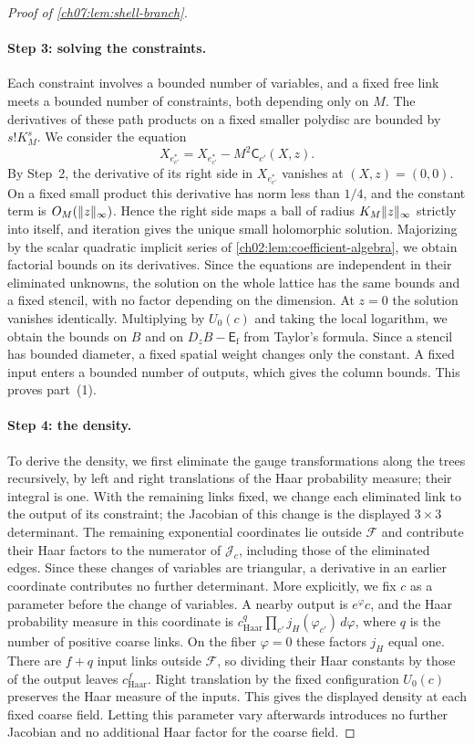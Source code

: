 \begin{proof}[Proof of \cref{ch07:lem:shell-branch}]
\paragraph{Step 3: solving the constraints.}
Each constraint involves a bounded number of variables, and a fixed free link meets a bounded number of constraints, both depending only on $M$. The derivatives of these path products on a fixed smaller polydisc are bounded by $s!K_M^s$. We consider the equation
\[
 X_{e^*_{c'}}=X_{e^*_{c'}}-M^2\mathsf C_{c'}(X,z).
\]
By Step~2, the derivative of its right side in $X_{e^*_{c'}}$ vanishes at $(X,z)=(0,0)$. On a fixed small product this derivative has norm less than $1/4$, and the constant term is $O_M(\lVert z\rVert_\infty)$. Hence the right side maps a ball of radius $K_M\lVert z\rVert_\infty$ strictly into itself, and iteration gives the unique small holomorphic solution. Majorizing by the scalar quadratic implicit series of \cref{ch02:lem:coefficient-algebra}, we obtain factorial bounds on its derivatives. Since the equations are independent in their eliminated unknowns, the solution on the whole lattice has the same bounds and a fixed stencil, with no factor depending on the dimension. At $z=0$ the solution vanishes identically. Multiplying by $U_0(c)$ and taking the local logarithm, we obtain the bounds on $B$ and on $D_zB-\mathsf E_{\mathrm f}$ from Taylor's formula. Since a stencil has bounded diameter, a fixed spatial weight changes only the constant. A fixed input enters a bounded number of outputs, which gives the column bounds. This proves part~(1).

\paragraph{Step 4: the density.}
To derive the density, we first eliminate the gauge transformations along the trees recursively, by left and right translations of the Haar probability measure; their integral is one. With the remaining links fixed, we change each eliminated link to the output of its constraint; the Jacobian of this change is the displayed $3\times3$ determinant. The remaining exponential coordinates lie outside $\mathcal F$ and contribute their Haar factors to the numerator of $\mathcal J_c$, including those of the eliminated edges. Since these changes of variables are triangular, a derivative in an earlier coordinate contributes no further determinant. More explicitly, we fix $c$ as a parameter before the change of variables. A nearby output is $e^\varphi c$, and the Haar probability measure in this coordinate is $c_{\mathrm{Haar}}^q\prod_{c'}j_H(\varphi_{c'})\,d\varphi$, where $q$ is the number of positive coarse links. On the fiber $\varphi=0$ these factors $j_H$ equal one. There are $f+q$ input links outside $\mathcal F$, so dividing their Haar constants by those of the output leaves $c_{\mathrm{Haar}}^f$. Right translation by the fixed configuration $U_0(c)$ preserves the Haar measure of the inputs. This gives the displayed density at each fixed coarse field. Letting this parameter vary afterwards introduces no further Jacobian and no additional Haar factor for the coarse field.


\end{proof}
